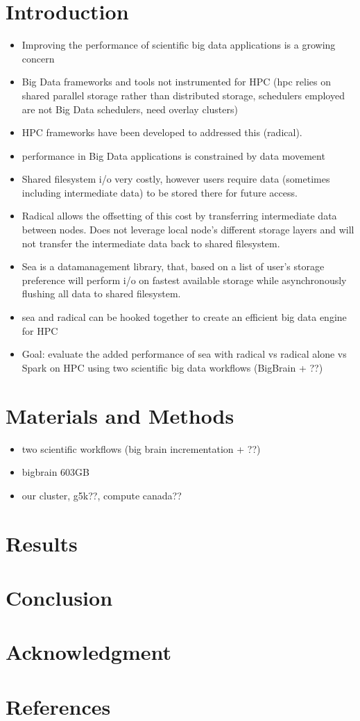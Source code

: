 \documentclass[conference]{IEEEtran}
\begin{document}
\section{Introduction}
\begin{itemize}
\item Improving the performance of scientific big data applications is a growing concern
\item Big Data frameworks and tools not instrumented for HPC (hpc relies on shared parallel storage rather than distributed storage, schedulers employed are not Big Data schedulers, need overlay clusters)
\item HPC frameworks have been developed to addressed this (radical).
\item performance in Big Data applications is constrained by data movement
\item Shared filesystem i/o very costly, however users require data (sometimes including intermediate data) to be stored there for future access.
\item Radical allows the offsetting of this cost by transferring intermediate data between nodes. Does not leverage local node's different storage layers and will not transfer the intermediate data back to shared filesystem.
\item Sea is a datamanagement library, that, based on a list of user's storage preference will perform i/o on fastest available storage while asynchronously flushing all data to shared filesystem.
\item sea and radical can be hooked together to create an efficient big data engine for HPC
\item Goal: evaluate the added performance of sea with radical vs radical alone vs Spark on HPC using two scientific big data workflows (BigBrain + ??)
\end{itemize}
\section{Materials and Methods}
\begin{itemize}
\item two scientific workflows (big brain incrementation + ??)
\item bigbrain 603GB
\item our cluster, g5k??, compute canada??
\end{itemize}
\section{Results}
\section{Conclusion}

\section*{Acknowledgment}

\section*{References}
\end{document}
